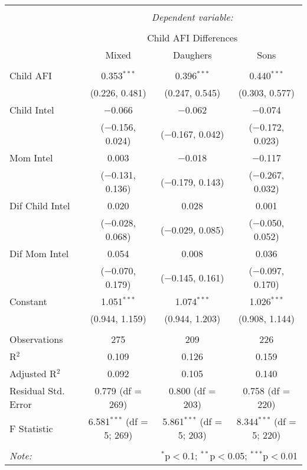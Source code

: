 
\begingroup 
\small 
\begin{tabular}{@{\extracolsep{1pt}}lccc} 
\\[-1.8ex]\hline 
\hline \\[-1.8ex] 
 & \multicolumn{3}{c}{\textit{Dependent variable:}} \\ 
\cline{2-4} 
\\[-1.8ex] & \multicolumn{3}{c}{Child AFI Differences} \\ 
 & Mixed & Daughers & Sons \\ 
\hline \\[-1.8ex] 
 Child AFI & 0.353$^{***}$ & 0.396$^{***}$ & 0.440$^{***}$ \\ 
  & (0.226, 0.481) & (0.247, 0.545) & (0.303, 0.577) \\ 
  Child Intel & $-$0.066 & $-$0.062 & $-$0.074 \\ 
  & ($-$0.156, 0.024) & ($-$0.167, 0.042) & ($-$0.172, 0.023) \\ 
  Mom Intel & 0.003 & $-$0.018 & $-$0.117 \\ 
  & ($-$0.131, 0.136) & ($-$0.179, 0.143) & ($-$0.267, 0.032) \\ 
  Dif Child Intel & 0.020 & 0.028 & 0.001 \\ 
  & ($-$0.028, 0.068) & ($-$0.029, 0.085) & ($-$0.050, 0.052) \\ 
  Dif Mom Intel & 0.054 & 0.008 & 0.036 \\ 
  & ($-$0.070, 0.179) & ($-$0.145, 0.161) & ($-$0.097, 0.170) \\ 
  Constant & 1.051$^{***}$ & 1.074$^{***}$ & 1.026$^{***}$ \\ 
  & (0.944, 1.159) & (0.944, 1.203) & (0.908, 1.144) \\ 
 \hline \\[-1.8ex] 
Observations & 275 & 209 & 226 \\ 
R$^{2}$ & 0.109 & 0.126 & 0.159 \\ 
Adjusted R$^{2}$ & 0.092 & 0.105 & 0.140 \\ 
Residual Std. Error & 0.779 (df = 269) & 0.800 (df = 203) & 0.758 (df = 220) \\ 
F Statistic & 6.581$^{***}$ (df = 5; 269) & 5.861$^{***}$ (df = 5; 203) & 8.344$^{***}$ (df = 5; 220) \\ 
\hline 
\hline \\[-1.8ex] 
\textit{Note:}  & \multicolumn{3}{r}{$^{*}$p$<$0.1; $^{**}$p$<$0.05; $^{***}$p$<$0.01} \\ 
\end{tabular} 
\endgroup 
